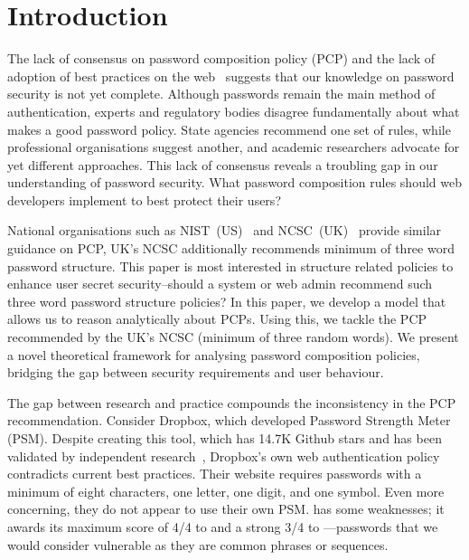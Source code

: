 \section{Introduction}

The lack of consensus on password composition policy (PCP) and the lack of adoption of best practices on the web~\cite{alroomi_measuring_2023, lomchan_comparison_2023, lim_evaluating_2023, maoneke_password_2019, furnell_assessing_2011, woo_survey_2018, lee_password_2022, gerlitz_please_2021} suggests that our knowledge on password security is not yet complete. Although passwords remain the main method of authentication, experts and regulatory bodies disagree fundamentally about what makes a good password policy. State agencies recommend one set of rules, while professional organisations suggest another, and academic researchers advocate for yet different approaches. This lack of consensus reveals a troubling gap in our understanding of password security. What password composition rules should web developers implement to best protect their users?

National organisations such as NIST~(US)~\cite{nist2024} and NCSC~(UK)~\cite{ncsc2024} provide similar guidance on PCP, UK's NCSC additionally recommends minimum of three word password structure. This paper is most interested in structure related policies to enhance user secret security--should a system or web admin recommend such three word password structure policies? In this paper, we develop a model that allows us to reason analytically about PCPs. Using this, we tackle the PCP recommended by the UK's NCSC (minimum of three random words). We present a novel theoretical framework for analysing password composition policies, bridging the gap between security requirements and user behaviour.

The gap between research and practice compounds the inconsistency in the PCP recommendation. Consider Dropbox, which developed \zxcvbn Password Strength Meter (PSM). Despite creating this tool, which has 14.7K Github stars and has been validated by independent research~\cite{wang_no_2023}, Dropbox's own web authentication policy contradicts current best practices. Their website requires passwords with a minimum of eight characters, one letter, one digit, and one symbol. Even more concerning, they do not appear to use their own PSM. \zxcvbn has some weaknesses; it awards its maximum score of 4/4 to  and a strong 3/4 to ---passwords that we would consider vulnerable as they are common phrases or sequences.

